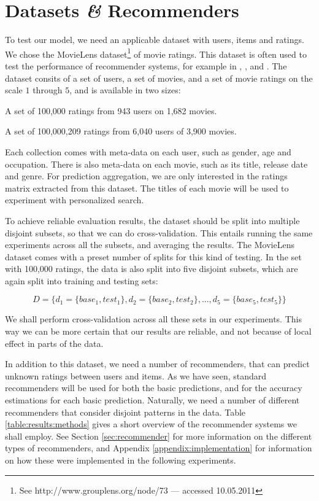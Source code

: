 \section{Datasets \emph{\&} Recommenders}

To test our model, we need an applicable dataset with users, items and ratings.
We chose the MovieLens dataset\footnote{
See http://www.grouplens.org/node/73 --- accessed 10.05.2011} of movie ratings.
This dataset is often used to test the performance of recommender systems,
for example in \citet[p9]{Alshamri2008}, \citet[p4]{Lemire2005}, \citet[p1]{Adomavicius2005}
and \citet[p2]{Herlocker2004}.
The dataset consits of a set of users, a set of movies, and a set of movie ratings
on the scale $1$ through $5$, and is available in two sizes:

\begin{itemize*}
  \item A set of 100,000 ratings from 943 users on 1,682 movies.
  \item A set of 100,000,209 ratings from 6,040 users of 3,900 movies.
\end{itemize*}

Each collection comes with meta-data on each user, such as
gender, age and occupation. There is also meta-data on each movie,
such as its title, release date and genre. 
For prediction aggregation, we are only interested in the ratings matrix
extracted from this dataset.
The titles of each movie will be used to experiment with personalized search.

To achieve reliable evaluation results, the dataset should be split into
multiple disjoint subsets, so that we can do cross-validation.
This entails running the same experiments across all the subsets,
and averaging the results.
The MovieLens dataset comes with a preset number of splits for this kind of testing.
In the set with 100,000 ratings, the data is also split into five disjoint subsets,
which are again split into training and testing sets:

\begin{equation*}
  D = \{ d_1 = \{base_1, test_1\}, d_2 = \{base_2, test_2\}, ..., d_5 = \{base_5, test_5\} \}
\end{equation*}

We shall perform cross-validation across all these sets in our experiments.
This way we can be more certain that our results are reliable,
and not because of local effect in parts of the data.

In addition to this dataset, we need a number of recommenders,
that can predict unknown ratings between users and items.
As we have seen, standard recommenders will be used for both the basic predictions,
and for the accuracy estimations for each basic prediction.
Naturally, we need a number of different recommenders that consider
disjoint patterns in the data. Table \ref{table:results:methods}
gives a short overview of the recommender systems we shall employ.
See Section \ref{sec:recommender} for more information on the different
types of recommenders, and Appendix \ref{appendix:implementation}
for information on how these were implemented in the following experiments.

